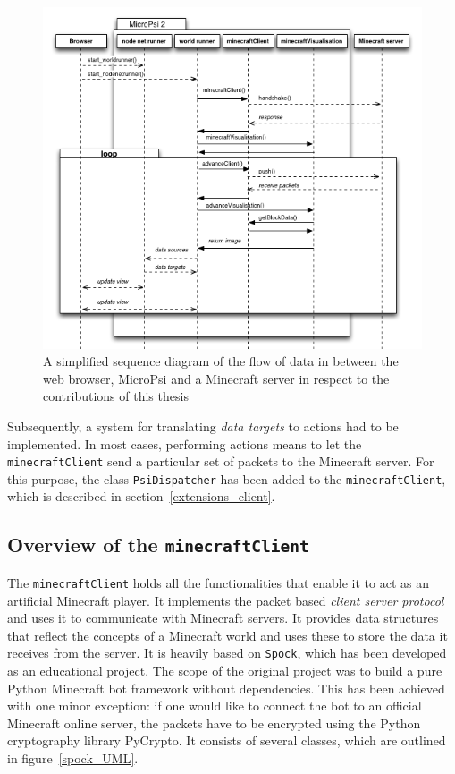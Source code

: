 \begin{figure}[h]
  \centering
    \includegraphics[width=15cm]{graphics/sequencediagram}
  \caption{A simplified sequence diagram of the flow of data in between the web browser, MicroPsi and a Minecraft server in respect to the contributions of this thesis}
  \label{spock_loop}
\end{figure}

Subsequently, a system for translating \emph{data targets} to actions had to be implemented. In most cases, performing actions means to let the \texttt{minecraftClient} send a particular set of packets to the Minecraft server. For this purpose, the class \texttt{PsiDispatcher} has been added to the \texttt{minecraftClient}, which is described in section~\ref{extensions_client}.


        \subsection{Overview of the \texttt{minecraftClient}}
The \texttt{minecraftClient} holds all the functionalities that enable it to act as an artificial Minecraft player. It implements the packet based \emph{client server protocol} and uses it to communicate with Minecraft servers. It provides data structures that reflect the concepts of a Minecraft world and uses these to store the data it receives from the server. It is heavily based on \texttt{Spock}, which has been developed as an educational project. The scope of the original project was to build a pure Python Minecraft bot framework without dependencies. This has been achieved with one minor exception: if one would like to connect the bot to an official Minecraft online server, the packets have to be encrypted using the Python cryptography library PyCrypto. It consists of several classes, which are outlined in figure~\ref{spock_UML}.

